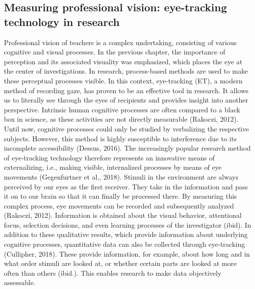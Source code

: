\documentclass[
  man]{apa6}
\begin{document}
\hypertarget{measuring-professional-vision-eye-tracking-technology-in-research}{%
\subsection{Measuring professional vision: eye-tracking technology in research}\label{measuring-professional-vision-eye-tracking-technology-in-research}}

Professional vision of teachers is a complex undertaking, consisting of various cognitive and visual processes. In the previous chapter, the importance of perception and its associated visuality was emphasized, which places the eye at the center of investigations. In research, process-based methods are used to make these perceptual processes visible. In this context, eye-tracking (ET), a modern method of recording gaze, has proven to be an effective tool in research. It allows us to literally see through the eyes of recipients and provides insight into another perspective. Intrinsic human cognitive processes are often compared to a black box in science, as these activities are not directly measurable (Rakoczi, 2012). Until now, cognitive processes could only be studied by verbalizing the respective subjects. However, this method is highly susceptible to interference due to its incomplete accessibility (Dessus, 2016). The increasingly popular research method of eye-tracking technology therefore represents an innovative means of externalizing, i.e., making visible, internalized processes by means of eye movements (Gegenfurtner et al., 2018). Stimuli in the environment are always perceived by our eyes as the first receiver. They take in the information and pass it on to our brain so that it can finally be processed there. By measuring this complex process, eye movements can be recorded and subsequently analyzed (Rakoczi, 2012). Information is obtained about the visual behavior, attentional focus, selection decisions, and even learning processes of the investigator (ibid). In addition to these qualitative results, which provide information about underlying cognitive processes, quantitative data can also be collected through eye-tracking (Cullipher, 2018). These provide information, for example, about how long and in what order stimuli are looked at, or whether certain parts are looked at more often than others (ibid.). This enables research to make data objectively assessable.
\end{document}
